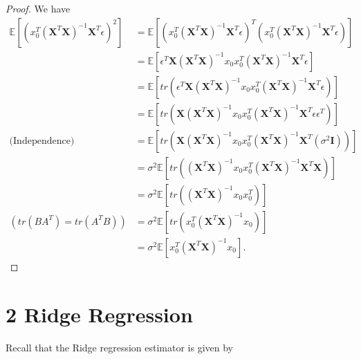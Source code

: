 \documentclass[10pt]{article}
\begin{document}
\begin{proof}
    We have
    \begin{align*}
        \mathbb{E}\left[\left(x_{0}^{T}\left(\mathbf{X}^{T} \mathbf{X}\right)^{-1} \mathbf{X}^{T} \epsilon\right)^{2}\right] &= \mathbb{E}\left[\left(x_{0}^{T}\left(\mathbf{X}^{T} \mathbf{X}\right)^{-1} \mathbf{X}^{T} \epsilon\right)^{T}\left(x_{0}^{T}\left(\mathbf{X}^{T} \mathbf{X}\right)^{-1} \mathbf{X}^{T} \epsilon\right)\right]\\
        &= \mathbb{E}\left[\epsilon^{T}\mathbf{X}\left(\mathbf{X}^{T} \mathbf{X}\right)^{-1} x_{0}x_{0}^{T}\left(\mathbf{X}^{T} \mathbf{X}\right)^{-1} \mathbf{X}^{T} \epsilon\right]\\
        &= \mathbb{E}\left[tr\left(\epsilon^{T}\mathbf{X}\left(\mathbf{X}^{T} \mathbf{X}\right)^{-1} x_{0}x_{0}^{T}\left(\mathbf{X}^{T} \mathbf{X}\right)^{-1} \mathbf{X}^{T} \epsilon\right)\right]\\
        & = \mathbb{E}\left[tr\left(\mathbf{X}\left(\mathbf{X}^{T} \mathbf{X}\right)^{-1} x_{0}x_{0}^{T}\left(\mathbf{X}^{T} \mathbf{X}\right)^{-1} \mathbf{X}^{T} \epsilon\epsilon^{T}\right)\right]\\
    \text{(Independence)}    &= \mathbb{E}\left[tr\left(\mathbf{X}\left(\mathbf{X}^{T} \mathbf{X}\right)^{-1} x_{0}x_{0}^{T}\left(\mathbf{X}^{T} \mathbf{X}\right)^{-1} \mathbf{X}^{T} (\sigma^{2}\mathbf{I})\right)\right]\\
    &= \sigma^2 \mathbb{E}\left[tr\left(\left(\mathbf{X}^{T} \mathbf{X}\right)^{-1} x_{0}x_{0}^{T}\left(\mathbf{X}^{T} \mathbf{X}\right)^{-1} \mathbf{X}^{T} \mathbf{X}\right)\right]\\
        &= \sigma^{2} \mathbb{E}\left[tr\left(\left(\mathbf{X}^{T} \mathbf{X}\right)^{-1} x_{0}x_{0}^{T}\right)\right]\\
    (tr(BA^T)=tr(A^TB))    &= \sigma^{2} \mathbb{E}\left[tr\left(x_{0}^{T}\left(\mathbf{X}^{T} \mathbf{X}\right)^{-1} x_{0}\right)\right]\\
        &= \sigma^{2} \mathbb{E}\left[x_{0}^{T}\left(\mathbf{X}^{T} \mathbf{X}\right)^{-1} x_{0}\right].
    \end{align*}
\end{proof}


\section*{2 Ridge Regression}
Recall that the Ridge regression estimator is given by
\end{document}
